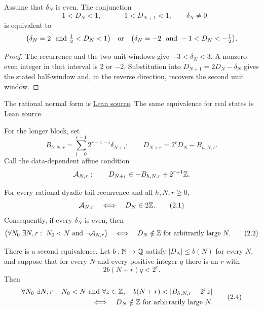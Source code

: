\documentclass[11pt]{article}
\begin{document}
\begin{theorem}\label{res:signedwindow}
Assume that $\delta_N$ is even.  The conjunction
\[
 -1<D_N<1,\qquad -1<D_{N+1}<1,\qquad \delta_N\ne0
\]
is equivalent to
\[
 \bigl(\delta_N=2\ \hbox{ and }\tfrac12<D_N<1\bigr)
 \quad\hbox{or}\quad
 \bigl(\delta_N=-2\ \hbox{ and }-1<D_N<-\tfrac12\bigr).
\]
\end{theorem}

\begin{proof}
The recurrence and the two unit windows give $-3<\delta_N<3$.  A nonzero even
integer in that interval is $2$ or $-2$.  Substitution into
$D_{N+1}=2D_N-\delta_N$ gives the stated half-window and, in the reverse
direction, recovers the second unit window.
\end{proof}

\noindent The rational normal form is \href{https://github.com/wcook04/plectis-erdos/blob/f36a98bf3d3e6f65f1074e3b800e3293d5b8a51a/ErdosProblems/Erdos251/AffineShiftEscape.lean#L113}{Lean source}.
The same equivalence for real states is
\href{https://github.com/wcook04/plectis-erdos/blob/f36a98bf3d3e6f65f1074e3b800e3293d5b8a51a/ErdosProblems/Erdos251/PaperCoreR7.lean#L135}{Lean source}.

For the longer block, set
\[
 B_{h,N,r}=\sum_{i=0}^{r-1}2^{r-1-i}\delta_{N+i};
 \qquad D_{N+r}=2^rD_N-B_{h,N,r}.
\]
Call the data-dependent affine condition
\[
 \mathcal A_{N,r}:\qquad
 D_{N+r}\in -B_{h,N,r}+2^{r+1}\mathbb{Z}.
\]

\begin{theorem}\label{res:affinecollapse}
For every rational dyadic tail recurrence and all $h,N,r\ge0$,
\[
 \mathcal A_{N,r}\quad\Longleftrightarrow\quad D_N\in2\mathbb{Z}.
\tag{2.1}\label{eq:affinecollapse}
\]
Consequently, if every $\delta_N$ is even, then
\[
 \bigl(\forall N_0\ \exists N,r:\ N_0<N\text{ and }\neg\mathcal A_{N,r}\bigr)
 \quad\Longleftrightarrow\quad
 D_N\notin\mathbb{Z}\text{ for arbitrarily large }N.
\tag{2.2}\label{eq:affinecofinal}
\]

There is a second equivalence.  Let $b:\mathbb{N}\to\mathbb{Q}$ satisfy
$|D_N|\le b(N)$ for every $N$, and suppose that for every $N$ and every
positive integer $q$ there is an $r$ with
\[
 2b(N+r)q<2^r.
\tag{2.3}\label{eq:dyadicscale}
\]
Then
\[
 \begin{split}
 &\forall N_0\ \exists N,r:\ N_0<N\text{ and }
   \forall z\in\Z,\quad
   b(N+r)<|B_{h,N,r}-2^rz|\\
 &\hspace{35mm}\Longleftrightarrow\quad
 D_N\notin\Z\text{ for arbitrarily large }N.
 \end{split}
\tag{2.4}\label{eq:fixedcollapse}
\]
\end{theorem}
\end{document}
